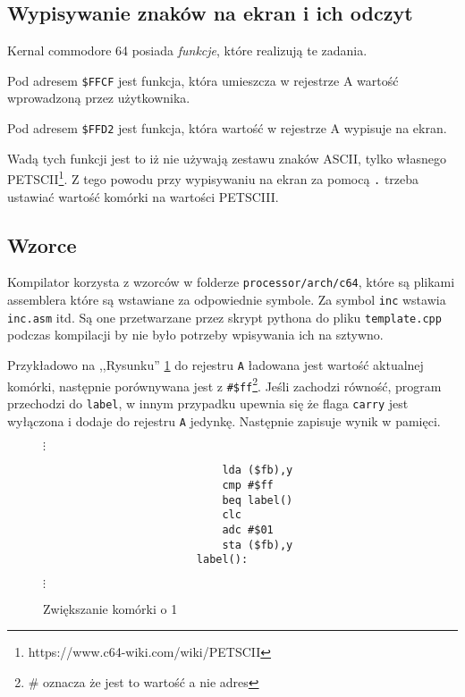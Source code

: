 \documentclass[a4paper,12pt]{article}
\begin{document}
    \subsection*{Wypisywanie znaków na ekran i ich odczyt}

    Kernal commodore 64 posiada \emph{funkcje}, które realizują te zadania.

    Pod adresem \texttt{\$FFCF} jest funkcja, która umieszcza w rejestrze A wartość wprowadzoną przez użytkownika.

    Pod adresem \texttt{\$FFD2} jest funkcja, która wartość w rejestrze A wypisuje na ekran.

    Wadą tych funkcji jest to iż nie używają zestawu znaków ASCII, tylko własnego PETSCII\footnote{https://www.c64-wiki.com/wiki/PETSCII}. Z tego powodu przy wypisywaniu na ekran za pomocą \texttt{.} trzeba ustawiać wartość komórki na wartości PETSCIII.

    \subsection*{Wzorce}

    Kompilator korzysta z wzorców w folderze \texttt{processor/arch/c64}, które są plikami assemblera które są wstawiane za odpowiednie symbole. Za symbol \texttt{inc} wstawia \texttt{inc.asm} itd. Są one przetwarzane przez skrypt pythona do pliku \texttt{template.cpp} podczas kompilacji by nie było potrzeby wpisywania ich na sztywno.
    
    Przykładowo na ,,Rysunku'' \ref{kod:inc} do rejestru \texttt{A} ładowana jest wartość aktualnej komórki, następnie porównywana jest z \texttt{\#\$ff}\footnote{\# oznacza że jest to wartość a nie adres}. Jeśli zachodzi równość, program przechodzi do \texttt{label}, w innym przypadku upewnia się że flaga \texttt{carry} jest wyłączona i dodaje do rejestru \texttt{A} jedynkę. Następnie zapisuje wynik w pamięci.

    \begin{figure}[h]
        $\vdots$
        \centering
        \begin{lstlisting}
                            lda ($fb),y
                            cmp #$ff
                            beq label()
                            clc
                            adc #$01
                            sta ($fb),y
                        label():
        \end{lstlisting}
        $\vdots$
        \centering
        \caption{Zwiększanie komórki o 1}
        \label{kod:inc}
    \end{figure}
    
\end{document}
